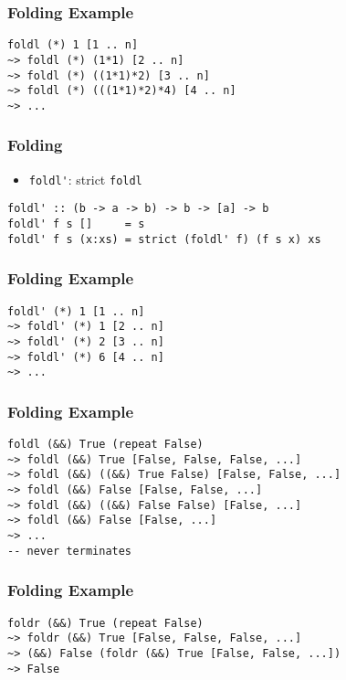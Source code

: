\documentclass[dvipsnames]{beamer}
\theoremstyle{plain}
\begin{document}
\begin{frame}[fragile]
  \frametitle{Folding Example}

  \begin{lstlisting}
foldl (*) 1 [1 .. n]
~> foldl (*) (1*1) [2 .. n]
~> foldl (*) ((1*1)*2) [3 .. n]
~> foldl (*) (((1*1)*2)*4) [4 .. n]
~> ...
  \end{lstlisting}
\end{frame}

\begin{frame}[fragile]
  \frametitle{Folding}

  \begin{itemize}
    \item \lstinline|foldl'|: strict \lstinline|foldl|
  \end{itemize}

  \begin{lstlisting}
foldl' :: (b -> a -> b) -> b -> [a] -> b
foldl' f s []     = s
foldl' f s (x:xs) = strict (foldl' f) (f s x) xs
  \end{lstlisting}
\end{frame}

\begin{frame}[fragile]
  \frametitle{Folding Example}

  \begin{lstlisting}
foldl' (*) 1 [1 .. n]
~> foldl' (*) 1 [2 .. n]
~> foldl' (*) 2 [3 .. n]
~> foldl' (*) 6 [4 .. n]
~> ...
  \end{lstlisting}
\end{frame}

\begin{frame}[fragile]
  \frametitle{Folding Example}

  \begin{lstlisting}
foldl (&&) True (repeat False)
~> foldl (&&) True [False, False, False, ...]
~> foldl (&&) ((&&) True False) [False, False, ...]
~> foldl (&&) False [False, False, ...]
~> foldl (&&) ((&&) False False) [False, ...]
~> foldl (&&) False [False, ...]
~> ...
-- never terminates
  \end{lstlisting}
\end{frame}

\begin{frame}[fragile]
  \frametitle{Folding Example}

  \begin{lstlisting}
foldr (&&) True (repeat False)
~> foldr (&&) True [False, False, False, ...]
~> (&&) False (foldr (&&) True [False, False, ...])
~> False
  \end{lstlisting}
\end{frame}
\end{document}
